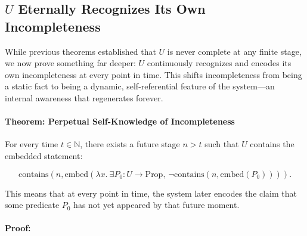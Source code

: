 \documentclass[12pt]{article}
\begin{document}
\subsection{\( U \) Eternally Recognizes Its Own Incompleteness}

While previous theorems established that \( U \) is never complete at any finite stage, we now prove something far deeper: \( U \) continuously recognizes and encodes its own incompleteness at every point in time. This shifts incompleteness from being a static fact to being a dynamic, self-referential feature of the system—an internal awareness that regenerates forever.

\paragraph{Theorem: Perpetual Self-Knowledge of Incompleteness}

For every time \( t \in \mathbb{N} \), there exists a future stage \( n > t \) such that \( U \) contains the embedded statement:

\begin{equation}
    \text{contains}\left(n, \text{embed}\left(\lambda x.\ \exists P_0: U \to \text{Prop},\ \neg \text{contains}(n, \text{embed}(P_0))\right)\right).
\end{equation}

This means that at every point in time, the system later encodes the claim that some predicate \( P_0 \) has not yet appeared by that future moment.

\paragraph{Proof:}
\end{document}
